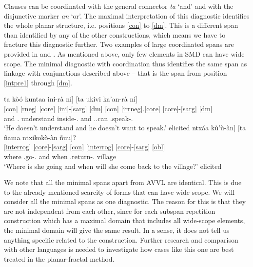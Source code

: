 \documentclass[output=paper]{langscibook}
\begin{document}
Clauses can be coordinated with the general connector \textit{ta} `and' and with the disjunctive marker \textit{an} `or'. 
The maximal interpretation of this diagnostic identifies the whole planar structure, i.e. positions \ref{con} to \ref{dm}. This is a different span than identified by any of the other constructions, which means we have to fracture this diagnostic further. 
Two examples of large coordinated spans are provided in  and .
As mentioned above, only few elements in SMD can have wide scope. The minimal diagnostic with coordination thus identifies the same span as linkage with conjunctions described above -- that is the span from position \ref{intpre1} through \ref{dm}. 

\ea
 \ea \label{ex:coordmax1}
    \glll {[}ta kòó kuntaa ini-rà ní] [ta ukivi ka'an-rà ní] \\
       \ref{con} \ref{rneg} \ref{core} \ref{ini}-\ref{sarg} \ref{dm}  \ref{con}  \ref{irrneg}.\ref{core} \ref{core}-\ref{sarg} \ref{dm}\\
      and \Neg.\Real{} understand inside-\Tsg.\M{} \Dm{} and \Neg.\Pot.can \Pot.speak-\Tsg.\M{} \Dm{} \\
    \glt `He doesn't understand and he doesn't want to speak.' \hfill elicited
 \ex \label{ex:coordmax2}
    \glll {[}ntxáa kù'ù-àn] [ta ñama ntxikokò-àn ñuu]?	\\
    \ref{interrog} \ref{core}-\ref{sarg} \ref{con} \ref{interrog} \ref{core}-\ref{sarg} \ref{obl} \\
    where \Pot.go-\Tsg.\F{} and when \Pot.return-\Tsg.\F{} village \\
    \glt `Where is she going and when will she come back to the village?' \hfill elicited
 \z
\z


We note that all the minimal spans apart from AVVL are identical. This is due to the already mentioned scarcity of forms that can have wide scope. We will consider all the minimal spans as one diagnostic.
The reason for this is that they are not independent from each other, since for each subspan repetition construction which has a maximal domain that includes all wide-scope elements, the minimal domain will give the same result. 
In a sense, it does not tell us anything specific related to the construction.
Further research and comparison with other languages is needed to investigate how cases like this one are best treated in the planar-fractal method.

\end{document}
